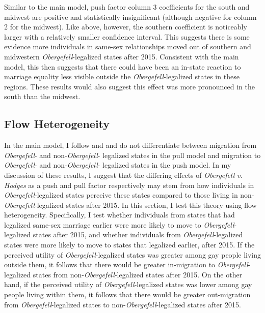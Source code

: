 \documentclass[12pt,letterpaper]{article}
\begin{document}
\FloatBarrier
Similar to the main model, push factor column 3 coefficients for the south and midwest are positive and statistically insignificant (although negative for column 2 for the midwest). Like above, however, the southern coefficient is noticeably larger with a relatively smaller confidence interval. This suggests there is some evidence more individuals in same-sex relationships moved out of southern and midwestern \textit{Obergefell}-legalized states after 2015. Consistent with the main model, this then suggests that there could have been an in-state reaction to marriage equality less visible outside the \textit{Obergefell}-legalized states in these regions. These results would also suggest this effect was more pronounced in the south than the midwest.

\FloatBarrier
\subsection{Flow Heterogeneity}

In the main model, I follow \citet{1} and \citet{12} and do not differentiate between migration from \textit{Obergefell}- and non-\textit{Obergefell}- legalized states in the pull model and migration to \textit{Obergefell}- and non-\textit{Obergefell}- legalized states in the push model.  In my discussion of these results, I suggest that the differing effects of \textit{Obergefell v. Hodges} as a push and pull factor respectively may stem from how individuals in \textit{Obergefell}-legalized states perceive these states compared to those living in non-\textit{Obergefell}-legalized states after 2015.  In this section, I test this theory using flow heterogeneity.  Specifically, I test whether individuals from states that had legalized same-sex marriage earlier were more likely to move to \textit{Obergefell}-legalized states after 2015, and whether individuals from \textit{Obergefell}-legalized states were more likely to move to states that legalized earlier, after 2015. If the perceived utility of \textit{Obergefell}-legalized states was greater among gay people living outside them, it follows that there would be greater in-migration to \textit{Obergefell}-legalized states from non-\textit{Obergefell}-legalized states after 2015. On the other hand, if the perceived utility of \textit{Obergefell}-legalized states was lower among gay people living within them, it follows that there would be greater out-migration from \textit{Obergefell}-legalized states to non-\textit{Obergefell}-legalized states after 2015.
\end{document}
